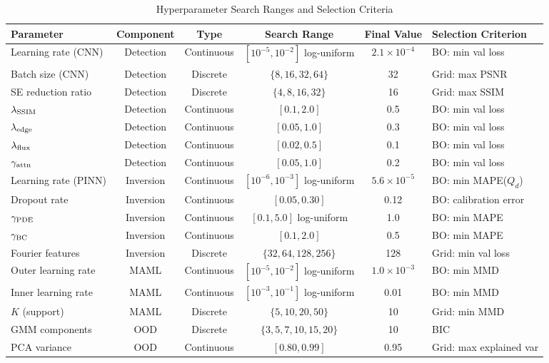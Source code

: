 \documentclass[usenatbib]{mnras}
\begin{document}
\begin{table}
\centering
\caption{Hyperparameter Search Ranges and Selection Criteria}\label{tab:hyper_search}
\begin{tabular}{lccccl}
\toprule
Parameter & Component & Type & Search Range & Final Value & Selection Criterion \\
\midrule
Learning rate (CNN) & Detection & Continuous & $[10^{-5}, 10^{-2}]$ log-uniform & $2.1 \times 10^{-4}$ & BO: min val loss \\
Batch size (CNN) & Detection & Discrete & $\{8, 16, 32, 64\}$ & 32 & Grid: max PSNR \\
SE reduction ratio & Detection & Discrete & $\{4, 8, 16, 32\}$ & 16 & Grid: max SSIM \\
$\lambda_{\rm SSIM}$ & Detection & Continuous & $[0.1, 2.0]$ & 0.5 & BO: min val loss \\
$\lambda_{\rm edge}$ & Detection & Continuous & $[0.05, 1.0]$ & 0.3 & BO: min val loss \\
$\lambda_{\rm flux}$ & Detection & Continuous & $[0.02, 0.5]$ & 0.1 & BO: min val loss \\
$\gamma_{\rm attn}$ & Detection & Continuous & $[0.05, 1.0]$ & 0.2 & BO: min val loss \\
\midrule
Learning rate (PINN) & Inversion & Continuous & $[10^{-6}, 10^{-3}]$ log-uniform & $5.6 \times 10^{-5}$ & BO: min MAPE($Q_d$) \\
Dropout rate & Inversion & Continuous & $[0.05, 0.30]$ & 0.12 & BO: calibration error \\
$\gamma_{\rm PDE}$ & Inversion & Continuous & $[0.1, 5.0]$ log-uniform & 1.0 & BO: min MAPE \\
$\gamma_{\rm BC}$ & Inversion & Continuous & $[0.1, 2.0]$ & 0.5 & BO: min MAPE \\
Fourier features & Inversion & Discrete & $\{32, 64, 128, 256\}$ & 128 & Grid: min val loss \\
\midrule
Outer learning rate & MAML & Continuous & $[10^{-5}, 10^{-2}]$ log-uniform & $1.0 \times 10^{-3}$ & BO: min MMD \\
Inner learning rate & MAML & Continuous & $[10^{-3}, 10^{-1}]$ log-uniform & 0.01 & BO: min MMD \\
$K$ (support) & MAML & Discrete & $\{5, 10, 20, 50\}$ & 10 & Grid: min MMD \\
\midrule
GMM components & OOD & Discrete & $\{3, 5, 7, 10, 15, 20\}$ & 10 & BIC \\
PCA variance & OOD & Continuous & $[0.80, 0.99]$ & 0.95 & Grid: max explained var \\

\end{tabular}
\end{table}
\end{document}
